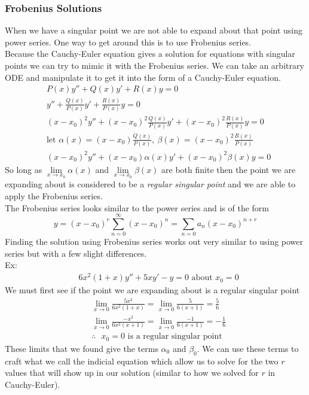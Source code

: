 \subsubsection{Frobenius Solutions}
When we have a singular point we are not able to expand about that point using power series. One way to get around this is to use Frobenius series.\\
Because the Cauchy-Euler equation gives a solution for equations with singular points we can try to mimic it with the Frobenius series. We can take an arbitrary ODE and manipulate it to get it into the form of a Cauchy-Euler equation.
\begin{align*}
    &P(x)y''+Q(x)y'+R(x)y=0\\
    &y''+\frac{Q(x)}{P(x)}y'+\frac{R(x)}{P(x)}y=0\\
    &(x-x_0)^2y''+(x-x_0)^2\frac{Q(x)}{P(x)}y'+(x-x_0)^2\frac{R(x)}{P(x)}y=0\\
    &\text{let }\alpha(x)=(x-x_0)\frac{Q(x)}{P(x)},\ \beta(x)=(x-x_0)^2\frac{R(x)}{P(x)}\\
    &(x-x_0)^2y''+(x-x_0)\alpha(x)y'+(x-x_0)^2\beta(x)y=0
\end{align*}
So long as $\lim\limits_{x\to x_0}\alpha(x)$ and $\lim\limits_{x\to x_0}\beta(x)$ are both finite then the point we are expanding about is considered to be a \textit{regular singular point} and we are able to apply the Frobenius series.\\
The Frobenius series looks similar to the power series and is of the form
$$y=(x-x_0)^r\sum_{n=0}^\infty(x-x_0)^n=\sum_{n=0}a_n(x-x_0)^{n+r}$$
Finding the solution using Frobenius series works out very similar to using power series but with a few slight differences.\\
Ex:
\begin{align*}
    &6x^2(1+x)y''+5xy'-y=0\text{ about }x_0=0
\end{align*}
We must first see if the point we are expanding about is a regular singular point
\begin{align*}
    &\lim_{x\to0}\frac{5x^2}{6x^2(1+x)}=\lim_{x\to0}\frac{5}{6(x+1)}=\frac{5}{6}\\
    &\lim_{x\to0}\frac{-x^2}{6x^2(x+1)}=\lim_{x\to0}\frac{-1}{6(x+1)}=-\frac{1}{6}\\
    &\therefore\text{ $x_0=0$ is a regular singular point}
\end{align*}
These limits that we found give the terms $\alpha_0$ and $\beta_0$. We can use these terms to craft what we call the indicial equation which allow us to solve for the two $r$ values that will show up in our solution (similar to how we solved for $r$ in Cauchy-Euler).
